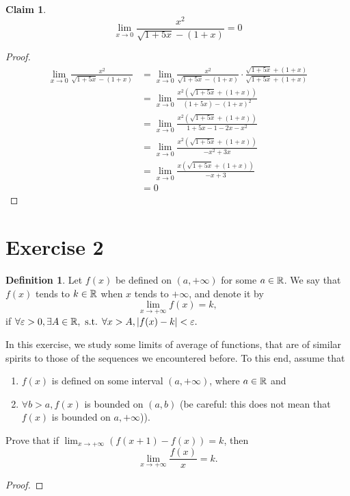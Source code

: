 \documentclass{homework}
\newcommand{\R}{\bb{R}} %
\newcommand{\ra}{\rightarrow}
\newcommand{\?}{\stackrel{?}{=}}
\newcommand{\ep}{\varepsilon}
\theoremstyle{definition}
\newtheorem*{claim}{Claim}
\newtheorem*{definition}{Definition}
\begin{document}
\question[4] \begin{claim}
    \[\lim_{x\ra0}\frac{x^2}{\sqrt{1+5x}-(1+x)}=0\]
\end{claim}

\begin{proof}
    \begin{align*}
        \lim_{x\ra0}\frac{x^2}{\sqrt{1+5x}-(1+x)}&=\lim_{x\ra0}\frac{x^2}{\sqrt{1+5x}-(1+x)}\cdot\frac{\sqrt{1+5x}+(1+x)}{\sqrt{1+5x}+(1+x)}\\
        &=\lim_{x\ra0}\frac{x^2(\sqrt{1+5x}+(1+x))}{(1+5x)-(1+x)^2}\\
        &=\lim_{x\ra0}\frac{x^2(\sqrt{1+5x}+(1+x))}{1+5x-1-2x-x^2}\\
        &=\lim_{x\ra0}\frac{x^2(\sqrt{1+5x}+(1+x))}{-x^2+3x}\\
        &=\lim_{x\ra0}\frac{x(\sqrt{1+5x}+(1+x))}{-x+3}\\
        &=0
    \end{align*}
\end{proof}

\newpage
\section*{Exercise 2}

\begin{definition}
    Let $f(x)$ be defined on $(a,+\infty)$ for some $a\in\R$. We say that $f(x)$ tends to $k\in\R$ when $x$ tends to $+\infty$, and denote it by \[\lim_{x\ra+\infty}f(x)=k,\] if \(\forall\ep>0, \exists A\in\R, \text{ s.t. } \forall x > A, |f(x)-k|<\ep.\)
\end{definition}

In this exercise, we study some limits of average of functions, that are of similar spirits to those of the sequences we encountered before. To this end, assume that 
\begin{enumerate}
    \item $f(x)$ is defined on some interval $(a,+\infty)$, where $a\in\R$ and 
    \item $\forall b>a, f(x)$ is bounded on $(a,b)$ (be careful: this does not mean that $f(x)$ is bounded on $a,+\infty$)).
\end{enumerate}

\question[1] Prove that if $\displaystyle\lim_{x\ra+\infty}(f(x+1)-f(x))=k$, then \[\displaystyle\lim_{x\ra+\infty}\frac{f(x)}{x}=k.\]

\begin{proof}
    
\end{proof}
\end{document}
